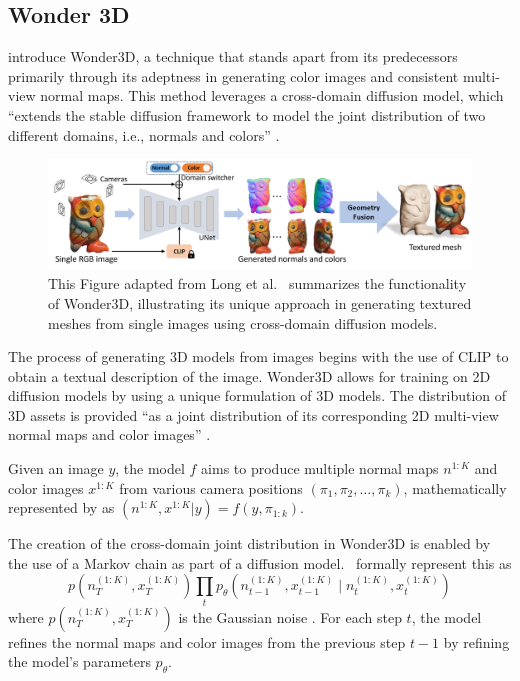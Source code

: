 \subsection{Wonder 3D}\label{Wonder3D}

\citeauthor{long2023wonder3d} introduce Wonder3D, a technique that stands apart from its predecessors primarily through its adeptness in generating color images and consistent multi-view normal maps. This method leverages a cross-domain diffusion model, which ``extends the stable diffusion framework to model the joint distribution of two different domains, i.e., normals and colors'' \citep{long2023wonder3d}.


\begin{figure}[ht]
  \centering
    \includegraphics[width=1\columnwidth]{figures/Wonder3D.png}
    \caption{This Figure adapted from Long et al.~\citep{long2023wonder3d} summarizes the functionality of Wonder3D, illustrating its unique approach in generating textured meshes from single images using cross-domain diffusion models.}\label{fig:Wonder3D}
\end{figure}

The process of generating 3D models from images begins with the use of CLIP \citep{radfordCLIP} to obtain a textual description of the image. Wonder3D allows for training on 2D diffusion models by using a unique formulation of 3D models. The distribution of 3D assets is provided ``as a joint distribution of its corresponding 2D multi-view normal maps and color images'' \citep{long2023wonder3d}. 

Given an image \( y \), the model \(f\) aims to produce multiple normal maps \( n^{1:K} \) and color images \( x^{1:K} \) from various camera positions \((\pi_1, \pi_2, \ldots, \pi_k)\), mathematically represented by \citeauthor{long2023wonder3d} as \((n^{1:K}, x^{1:K} | y) = f(y, \pi_{1:k})\).

The creation of the cross-domain joint distribution in Wonder3D is enabled by the use of a Markov chain as part of a diffusion model.~\citeauthor{long2023wonder3d} formally represent this as \[ p\left(n_T^{(1: K)}, x_T^{(1: K)}\right) \prod_t p_\theta\left(n_{t-1}^{(1: K)}, x_{t-1}^{(1: K)} \mid n_t^{(1: K)}, x_t^{(1: K)}\right) \] where \( p\left(n_T^{(1: K)}, x_T^{(1: K)}\right) \) is the Gaussian noise \citep{long2023wonder3d}. For each step \(t\), the model refines the normal maps and color images from the previous step \(t-1\) by refining the model's parameters \(p_\theta\).

